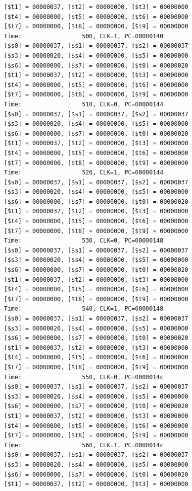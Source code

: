 \documentclass[a4paper,12pt]{article}
\begin{document}
\begin{lstlisting}
[$t1] = 00000037, [$t2] = 00000000, [$t3] = 00000000
[$t4] = 00000000, [$t5] = 00000000, [$t6] = 00000000
[$t7] = 00000000, [$t8] = 00000000, [$t9] = 00000000
Time:                 500, CLK=1, PC=00000140
[$s0] = 00000037, [$s1] = 00000037, [$s2] = 00000037
[$s3] = 00000020, [$s4] = 00000000, [$s5] = 00000000
[$s6] = 00000000, [$s7] = 00000000, [$t0] = 00000020
[$t1] = 00000037, [$t2] = 00000000, [$t3] = 00000000
[$t4] = 00000000, [$t5] = 00000000, [$t6] = 00000000
[$t7] = 00000000, [$t8] = 00000000, [$t9] = 00000000
Time:                 510, CLK=0, PC=00000144
[$s0] = 00000037, [$s1] = 00000037, [$s2] = 00000037
[$s3] = 00000020, [$s4] = 00000000, [$s5] = 00000000
[$s6] = 00000000, [$s7] = 00000000, [$t0] = 00000020
[$t1] = 00000037, [$t2] = 00000000, [$t3] = 00000000
[$t4] = 00000000, [$t5] = 00000000, [$t6] = 00000000
[$t7] = 00000000, [$t8] = 00000000, [$t9] = 00000000
Time:                 520, CLK=1, PC=00000144
[$s0] = 00000037, [$s1] = 00000037, [$s2] = 00000037
[$s3] = 00000020, [$s4] = 00000000, [$s5] = 00000000
[$s6] = 00000000, [$s7] = 00000000, [$t0] = 00000020
[$t1] = 00000037, [$t2] = 00000000, [$t3] = 00000000
[$t4] = 00000000, [$t5] = 00000000, [$t6] = 00000000
[$t7] = 00000000, [$t8] = 00000000, [$t9] = 00000000
Time:                 530, CLK=0, PC=00000148
[$s0] = 00000037, [$s1] = 00000037, [$s2] = 00000037
[$s3] = 00000020, [$s4] = 00000000, [$s5] = 00000000
[$s6] = 00000000, [$s7] = 00000000, [$t0] = 00000020
[$t1] = 00000037, [$t2] = 00000000, [$t3] = 00000000
[$t4] = 00000000, [$t5] = 00000000, [$t6] = 00000000
[$t7] = 00000000, [$t8] = 00000000, [$t9] = 00000000
Time:                 540, CLK=1, PC=00000148
[$s0] = 00000037, [$s1] = 00000037, [$s2] = 00000037
[$s3] = 00000020, [$s4] = 00000000, [$s5] = 00000000
[$s6] = 00000000, [$s7] = 00000000, [$t0] = 00000020
[$t1] = 00000037, [$t2] = 00000000, [$t3] = 00000000
[$t4] = 00000000, [$t5] = 00000000, [$t6] = 00000000
[$t7] = 00000000, [$t8] = 00000000, [$t9] = 00000000
Time:                 550, CLK=0, PC=0000014c
[$s0] = 00000037, [$s1] = 00000037, [$s2] = 00000037
[$s3] = 00000020, [$s4] = 00000000, [$s5] = 00000000
[$s6] = 00000000, [$s7] = 00000000, [$t0] = 00000020
[$t1] = 00000037, [$t2] = 00000000, [$t3] = 00000000
[$t4] = 00000000, [$t5] = 00000000, [$t6] = 00000000
[$t7] = 00000000, [$t8] = 00000000, [$t9] = 00000000
Time:                 560, CLK=1, PC=0000014c
[$s0] = 00000037, [$s1] = 00000037, [$s2] = 00000037
[$s3] = 00000020, [$s4] = 00000000, [$s5] = 00000000
[$s6] = 00000000, [$s7] = 00000000, [$t0] = 00000020
[$t1] = 00000037, [$t2] = 00000000, [$t3] = 00000000

\end{lstlisting}
\end{document}
